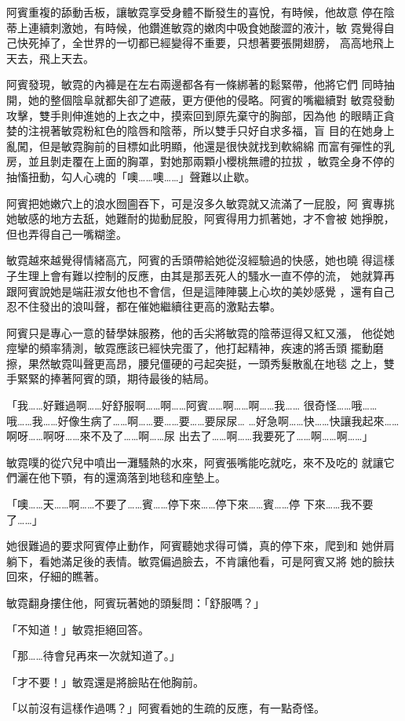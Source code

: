 阿賓重複的舔動舌板，讓敏霓享受身體不斷發生的喜悅，有時候，他故意
停在陰蒂上連續刺激她，有時候，他鑽進敏霓的嫩肉中吸食她酸澀的液汁，敏
霓覺得自己快死掉了，全世界的一切都已經變得不重要，只想著要張開翅膀，
高高地飛上天去，飛上天去。

阿賓發現，敏霓的內褲是在左右兩邊都各有一條綁著的鬆緊帶，他將它們
同時抽開，她的整個陰阜就都失卻了遮蔽，更方便他的侵略。阿賓的嘴繼續對
敏霓發動攻擊，雙手則伸進她的上衣之中，摸索回到原先棄守的胸部，因為他
的眼睛正貪婪的注視著敏霓粉紅色的陰唇和陰蒂，所以雙手只好自求多福，盲
目的在她身上亂闖，但是敏霓胸前的目標如此明顯，他還是很快就找到軟綿綿
而富有彈性的乳房，並且剝走覆在上面的胸罩，對她那兩顆小櫻桃無禮的拉拔
，敏霓全身不停的抽慉扭動，勾人心魂的「噢……噢……」聲難以止歇。

阿賓把她嫩穴上的浪水囫圇吞下，可是沒多久敏霓就又流滿了一屁股，阿
賓專挑她敏感的地方去舐，她難耐的拋動屁股，阿賓得用力抓著她，才不會被
她掙脫，但也弄得自己一嘴糊塗。

敏霓越來越覺得情緒高亢，阿賓的舌頭帶給她從沒經驗過的快感，她也曉
得這樣子生理上會有難以控制的反應，由其是那丟死人的騷水一直不停的流，
她就算再跟阿賓說她是端莊淑女他也不會信，但是這陣陣襲上心坎的美妙感覺
，還有自己忍不住發出的浪叫聲，都在催她繼續往更高的激點去攀。

阿賓只是專心一意的替學妹服務，他的舌尖將敏霓的陰蒂逗得又紅又漲，
他從她痙攣的頻率猜測，敏霓應該已經快完蛋了，他打起精神，疾速的將舌頭
擺動磨擦，果然敏霓叫聲更高昂，腰兒僵硬的弓起突挺，一頭秀髮散亂在地毯
之上，雙手緊緊的捧著阿賓的頭，期待最後的結局。

「我……好難過啊……好舒服啊……啊……阿賓……啊……啊……我……
很奇怪……哦……哦……我……好像生病了……啊……要……要……要尿尿…
…好急啊……快……快讓我起來……啊呀……啊呀……來不及了……啊……尿
出去了……啊……我要死了……啊……啊……」

敏霓噗的從穴兒中噴出一灘騷熱的水來，阿賓張嘴能吃就吃，來不及吃的
就讓它們灑在他下顎，有的還滴落到地毯和座墊上。

「噢……天……啊……不要了……賓……停下來……停下來……賓……停
下來……我不要了……」

她很難過的要求阿賓停止動作，阿賓聽她求得可憐，真的停下來，爬到和
她併肩躺下，看她滿足後的表情。敏霓偏過臉去，不肯讓他看，可是阿賓又將
她的臉扶回來，仔細的瞧著。

敏霓翻身摟住他，阿賓玩著她的頭髮問：「舒服嗎？」

「不知道！」敏霓拒絕回答。

「那……待會兒再來一次就知道了。」

「才不要！」敏霓還是將臉貼在他胸前。

「以前沒有這樣作過嗎？」阿賓看她的生疏的反應，有一點奇怪。

